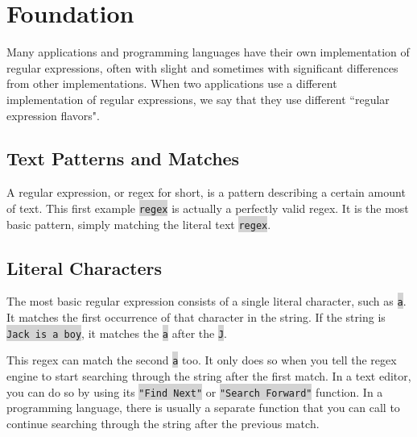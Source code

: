 \part{Foundation}

Many applications and programming languages have their own implementation of regular expressions, often with slight and sometimes with significant differences from other implementations. When two applications use a different implementation of regular expressions, we say that they use different ``regular expression flavors". 




\chapter{Text Patterns and Matches}



A regular expression, or regex for short, is a pattern describing a certain amount of text. This first example \colorbox{lightgray}{\texttt{regex}} is actually a perfectly valid regex. It is the most basic pattern, simply matching the literal text \colorbox{lightgray}{\texttt{regex}}.



















\chapter{Literal Characters}


The most basic regular expression consists of a single literal character, such as \colorbox{lightgray}{\texttt{a}}. It matches the first occurrence of that character in the string. If the string is \colorbox{lightgray}{\texttt{Jack is a boy}}, it matches the \colorbox{lightgray}{\texttt{a}} after the \colorbox{lightgray}{\texttt{J}}.


This regex can match the second \colorbox{lightgray}{\texttt{a}} too. It only does so when you tell the regex engine to start searching through the string after the first match. In a text editor, you can do so by using its \colorbox{lightgray}{\texttt{"Find Next"}} or \colorbox{lightgray}{\texttt{"Search Forward"}} function. In a programming language, there is usually a separate function that you can call to continue searching through the string after the previous match.

